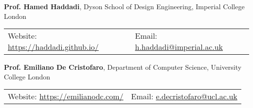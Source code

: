 \documentclass[8pt]{article}
\newcommand{\halfblankline}{\quad\vspace{-0.5\baselineskip}\pagebreak[3]}
\begin{document}
\halfblankline

\textbf{Prof. Hamed Haddadi}, Dyson School of Design Engineering, Imperial College London

\enskip\begin{tabular}{p{6cm}l}
	Website: \href{https://haddadi.github.io/}{https://haddadi.github.io/} &
	Email: \href{mailto:h.haddadi@imperial.ac.uk}{h.haddadi@imperial.ac.uk}\\
\end{tabular}

\halfblankline

\textbf{Prof. Emiliano De Cristofaro}, Department of Computer Science, University College London

\enskip\begin{tabular}{p{6cm}l}
	Website: \href{https://emilianodc.com/}{https://emilianodc.com/} &
	Email: \href{mailto:e.decristofaro@ucl.ac.uk}{e.decristofaro@ucl.ac.uk}\\
\end{tabular}
\end{document}
